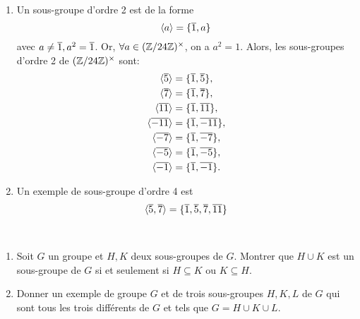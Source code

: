 {\begin{td-sol}[]
\begin{enumerate}
            \item Un sous-groupe d'ordre 2 est de la forme
            \begin{equation*}
                \langle a\rangle = \{\overline{1}, a\}
            \end{equation*}
            avec \(a\ne\overline{1}, a^2 = \overline{1}\). Or, \(\forall a\in(\mathbb{Z}/24\mathbb{Z})^\times\),
            on a \(a^2=1\). Alors, les sous-groupes d'ordre 2 de \((\mathbb{Z}/24\mathbb{Z})^\times\)
            sont:
            \begin{equation*}
                \begin{aligned}
                    \langle\overline{5}\rangle &= \{\overline{1}, \overline{5}\},\\
                    \langle\overline{7}\rangle &= \{\overline{1}, \overline{7}\},\\
                    \langle\overline{11}\rangle &= \{\overline{1}, \overline{11}\},\\
                    \langle\overline{-11}\rangle &= \{\overline{1}, \overline{-11}\},\\
                    \langle\overline{-7}\rangle &= \{\overline{1}, \overline{-7}\},\\
                    \langle\overline{-5}\rangle &= \{\overline{1}, \overline{-5}\},\\
                    \langle\overline{-1}\rangle &= \{\overline{1}, \overline{-1}\}.
                \end{aligned}
            \end{equation*}

            \item Un exemple de sous-groupe d'ordre 4 est
            \begin{equation*}
                \langle\overline{5}, \overline{7}\rangle = \{\overline{1}, \overline{5}, \overline{7}, \overline{11}\}
            \end{equation*}
        \end{enumerate}
    \end{td-sol}
}{}

\begin{td-exo}\, %
    \begin{enumerate}
        \item Soit \(G\) un groupe et \(H,K\)  deux sous-groupes de \(G\).
        Montrer que \(H\cup K\) est un sous-groupe de \(G\) si et seulement
        si \(H\subseteq K\) ou \(K\subseteq H\).

        \item Donner un exemple de groupe \(G\) et de trois sous-groupes
        \(H,K,L\) de \(G\) qui sont tous les trois différents de \(G\) et
        tels que \(G=H\cup K\cup L\).
    \end{enumerate}
\end{td-exo}

